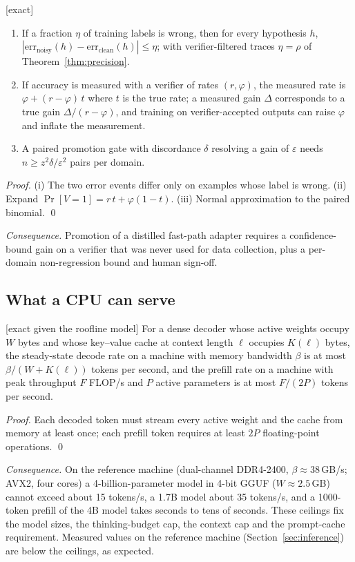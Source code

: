 \begin{proposition} \textnormal{[exact]}
\label{prop:distill}
\begin{enumerate}[label=(\roman*)]
\item If a fraction $\eta$ of training labels is wrong, then for every
hypothesis $h$, $|\mathrm{err}_{\text{noisy}}(h)-\mathrm{err}_{\text{clean}}(h)|\le\eta$;
with verifier-filtered traces $\eta=\rho$ of Theorem~\ref{thm:precision}.
\item If accuracy is measured with a verifier of rates $(r,\varphi)$, the
measured rate is $\varphi+(r-\varphi)\,t$ where $t$ is the true rate; a measured
gain $\Delta$ corresponds to a true gain $\Delta/(r-\varphi)$, and training on
verifier-accepted outputs can raise $\varphi$ and inflate the measurement.
\item A paired promotion gate with discordance $\delta$ resolving a gain of
$\varepsilon$ needs $n\ge z^2\delta/\varepsilon^2$ pairs per domain.
\end{enumerate}
\end{proposition}
\begin{proof}
(i) The two error events differ only on examples whose label is wrong.
(ii) Expand $\Pr[V=1]=r\,t+\varphi(1-t)$. (iii) Normal approximation to the
paired binomial. \qed
\end{proof}
\emph{Consequence.} Promotion of a distilled fast-path adapter requires a
confidence-bound gain on a verifier that was never used for data collection,
plus a per-domain non-regression bound and human sign-off.

\subsection{What a CPU can serve}

\begin{proposition} \textnormal{[exact given the
roofline model]}
\label{prop:roofline}
For a dense decoder whose active weights occupy $W$ bytes and whose key--value
cache at context length $\ell$ occupies $K(\ell)$ bytes, the steady-state
decode rate on a machine with memory bandwidth $\beta$ is at most
$\beta/(W+K(\ell))$ tokens per second, and the prefill rate on a machine with
peak throughput $F$ FLOP/s and $P$ active parameters is at most $F/(2P)$
tokens per second.
\end{proposition}
\begin{proof}
Each decoded token must stream every active weight and the cache from memory
at least once; each prefill token requires at least $2P$ floating-point
operations. \qed
\end{proof}
\emph{Consequence.} On the reference machine (dual-channel DDR4-2400,
$\beta\approx38$\,GB/s; AVX2, four cores) a 4-billion-parameter model in 4-bit
GGUF ($W\approx2.5$\,GB) cannot exceed about 15 tokens/s, a 1.7B model about
35 tokens/s, and a 1000-token prefill of the 4B model takes seconds to tens of
seconds. These ceilings fix the model sizes, the thinking-budget cap, the
context cap and the prompt-cache requirement. Measured
values on the reference machine (Section~\ref{sec:inference}) are below the
ceilings, as expected.

